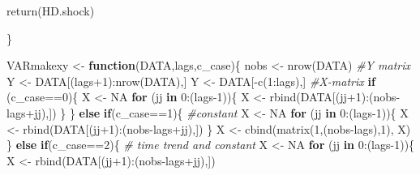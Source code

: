 \documentclass[
]{book}
\newenvironment{Shaded}{\begin{snugshade}}{\end{snugshade}}
\newcommand{\CommentTok}[1]{\textcolor[rgb]{0.56,0.35,0.01}{\textit{#1}}}
\newcommand{\ConstantTok}[1]{\textcolor[rgb]{0.00,0.00,0.00}{#1}}
\newcommand{\ControlFlowTok}[1]{\textcolor[rgb]{0.13,0.29,0.53}{\textbf{#1}}}
\newcommand{\DecValTok}[1]{\textcolor[rgb]{0.00,0.00,0.81}{#1}}
\newcommand{\FunctionTok}[1]{\textcolor[rgb]{0.00,0.00,0.00}{#1}}
\newcommand{\NormalTok}[1]{#1}
\newcommand{\OtherTok}[1]{\textcolor[rgb]{0.56,0.35,0.01}{#1}}
\newcommand{\SpecialCharTok}[1]{\textcolor[rgb]{0.00,0.00,0.00}{#1}}
\begin{document}
\begin{Shaded}
\begin{Highlighting}[]
\FunctionTok{return}\NormalTok{(HD.shock)}

\NormalTok{\}}

\NormalTok{VARmakexy }\OtherTok{\textless{}{-}} \ControlFlowTok{function}\NormalTok{(DATA,lags,c\_case)\{}
\NormalTok{nobs }\OtherTok{\textless{}{-}} \FunctionTok{nrow}\NormalTok{(DATA)}
\CommentTok{\#Y matrix }
\NormalTok{Y }\OtherTok{\textless{}{-}}\NormalTok{ DATA[(lags}\SpecialCharTok{+}\DecValTok{1}\NormalTok{)}\SpecialCharTok{:}\FunctionTok{nrow}\NormalTok{(DATA),]}
\NormalTok{Y }\OtherTok{\textless{}{-}}\NormalTok{ DATA[}\SpecialCharTok{{-}}\FunctionTok{c}\NormalTok{(}\DecValTok{1}\SpecialCharTok{:}\NormalTok{lags),]}
\CommentTok{\#X{-}matrix }
\ControlFlowTok{if}\NormalTok{ (c\_case}\SpecialCharTok{==}\DecValTok{0}\NormalTok{)\{}
\NormalTok{  X }\OtherTok{\textless{}{-}} \ConstantTok{NA}
  \ControlFlowTok{for}\NormalTok{ (jj }\ControlFlowTok{in} \DecValTok{0}\SpecialCharTok{:}\NormalTok{(lags}\DecValTok{{-}1}\NormalTok{))\{}
\NormalTok{        X }\OtherTok{\textless{}{-}} \FunctionTok{rbind}\NormalTok{(DATA[(jj}\SpecialCharTok{+}\DecValTok{1}\NormalTok{)}\SpecialCharTok{:}\NormalTok{(nobs}\SpecialCharTok{{-}}\NormalTok{lags}\SpecialCharTok{+}\NormalTok{jj),])}
\NormalTok{      \} }
\NormalTok{  \} }\ControlFlowTok{else} \ControlFlowTok{if}\NormalTok{(c\_case}\SpecialCharTok{==}\DecValTok{1}\NormalTok{)\{ }\CommentTok{\#constant}
\NormalTok{      X }\OtherTok{\textless{}{-}} \ConstantTok{NA}
      \ControlFlowTok{for}\NormalTok{ (jj }\ControlFlowTok{in} \DecValTok{0}\SpecialCharTok{:}\NormalTok{(lags}\DecValTok{{-}1}\NormalTok{))\{}
\NormalTok{        X }\OtherTok{\textless{}{-}} \FunctionTok{rbind}\NormalTok{(DATA[(jj}\SpecialCharTok{+}\DecValTok{1}\NormalTok{)}\SpecialCharTok{:}\NormalTok{(nobs}\SpecialCharTok{{-}}\NormalTok{lags}\SpecialCharTok{+}\NormalTok{jj),])}
\NormalTok{      \}}
\NormalTok{      X }\OtherTok{\textless{}{-}} \FunctionTok{cbind}\NormalTok{(}\FunctionTok{matrix}\NormalTok{(}\DecValTok{1}\NormalTok{,(nobs}\SpecialCharTok{{-}}\NormalTok{lags),}\DecValTok{1}\NormalTok{), X) }
\NormalTok{    \} }\ControlFlowTok{else} \ControlFlowTok{if}\NormalTok{(c\_case}\SpecialCharTok{==}\DecValTok{2}\NormalTok{)\{ }\CommentTok{\# time trend and constant}
\NormalTok{      X }\OtherTok{\textless{}{-}} \ConstantTok{NA}
      \ControlFlowTok{for}\NormalTok{ (jj }\ControlFlowTok{in} \DecValTok{0}\SpecialCharTok{:}\NormalTok{(lags}\DecValTok{{-}1}\NormalTok{))\{}
\NormalTok{        X }\OtherTok{\textless{}{-}} \FunctionTok{rbind}\NormalTok{(DATA[(jj}\SpecialCharTok{+}\DecValTok{1}\NormalTok{)}\SpecialCharTok{:}\NormalTok{(nobs}\SpecialCharTok{{-}}\NormalTok{lags}\SpecialCharTok{+}\NormalTok{jj),])}

\end{Highlighting}
\end{Shaded}
\end{document}
